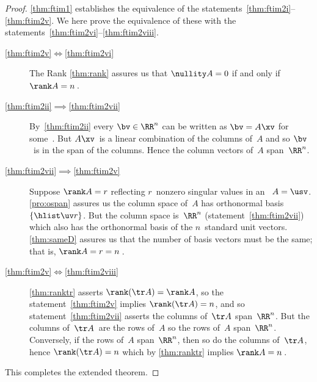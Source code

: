 \begin{proof} 
\cref{thm:ftim1} establishes the equivalence of the statements~\ref{thm:ftim2i}--\ref{thm:ftim2v}.  
We here prove the equivalence of these with the statements~\ref{thm:ftim2vi}--\ref{thm:ftim2viii}.
\begin{description}
\item[\ref{thm:ftim2v}$\iff$\ref{thm:ftim2vi}]
The Rank \cref{thm:rank} assures us that \(\nullity A=0\) if and only if \(\rank A=n\)\,.
\item[\ref{thm:ftim2ii}$\implies$\ref{thm:ftim2vii}] 
By~\ref{thm:ftim2ii} every \(\bv\in\RR^n\) can be written as \(\bv=A\xv\) for some~\xv. 
But \(A\xv\)~is a linear combination of the columns of~\(A\) and so \(\bv\)~is in the span of the columns.  
Hence the column vectors of~\(A\) span~\(\RR^n\).
\item[\ref{thm:ftim2vii}$\implies$\ref{thm:ftim2v}] 
Suppose \(\rank A=r\) reflecting \(r\)~nonzero singular values in an \svd\ \(A=\usv\).
\cref{pro:ospan} assures us the column space of~\(A\) has  orthonormal basis~\(\{\hlist\uv r\}\).
But the column space is~\(\RR^n\) (statement~\ref{thm:ftim2vii}) which also has the orthonormal basis of the \(n\)~standard unit vectors.
\cref{thm:sameD} assures us that the number of basis vectors must be the same; that is, \(\rank A=r=n\)\,.
\item[\ref{thm:ftim2v}$\iff$\ref{thm:ftim2viii}] 
\cref{thm:ranktr} asserts \(\rank(\tr A)=\rank A\),  so the statement~\ref{thm:ftim2v} implies \(\rank(\tr A)=n\), and so statement~\ref{thm:ftim2vii} asserts the columns of~\(\tr A\) span~\(\RR^n\).
But the columns of~\(\tr A\)\ are the rows of~\(A\) so the rows of~\(A\) span~\(\RR^n\).
Conversely, if the rows of~\(A\) span~\(\RR^n\), then so do the columns of~\(\tr A\), hence \(\rank(\tr A)=n\) which by \cref{thm:ranktr} implies \(\rank A=n\)\,.
\end{description}
This completes the extended theorem.
\end{proof}








\sectionExercises



